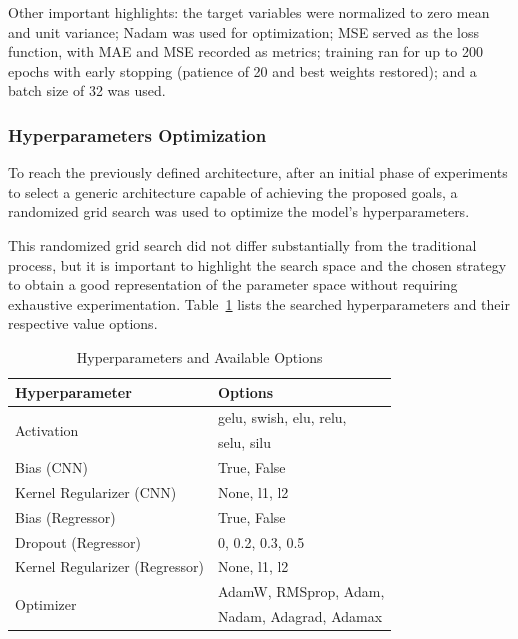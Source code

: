 \documentclass[10pt,conference]{IEEEtran}
\begin{document}
Other important highlights: the target variables were normalized to zero mean and unit variance; Nadam was used for optimization; MSE served as the loss function, with MAE and MSE recorded as metrics; training ran for up to 200 epochs with early stopping (patience of 20 and best weights restored); and a batch size of 32 was used.

\subsubsection{Hyperparameters Optimization}

To reach the previously defined architecture, after an initial phase of experiments to select a generic architecture capable of achieving the proposed goals, a randomized grid search was used to optimize the model’s hyperparameters.

This randomized grid search did not differ substantially from the traditional process, but it is important to highlight the search space and the chosen strategy to obtain a good representation of the parameter space without requiring exhaustive experimentation. Table~\ref{tab:hyperparams_options} lists the searched hyperparameters and their respective value options.


\begin{table} \small \centering
  \caption{Hyperparameters and Available Options}
  \label{tab:hyperparams_options}
\begin{tabular*}{\columnwidth}
    {@{\extracolsep{\fill}}ll}
    \toprule
    Hyperparameter & Options \\
    \midrule
    \multirow{2}{*}{Activation} & gelu, swish, elu, relu,  \\
    & selu, silu \\
    Bias (CNN) & True, False \\
    Kernel Regularizer (CNN) & None, l1, l2 \\
    Bias (Regressor) & True, False \\
    Dropout (Regressor) & 0, 0.2, 0.3, 0.5 \\
    Kernel Regularizer (Regressor) & None, l1, l2 \\
    \multirow{2}{*}{Optimizer} & AdamW, RMSprop, Adam, \\
    & Nadam, Adagrad, Adamax \\
    \bottomrule
  \end{tabular*}
\end{table}
\end{document}

